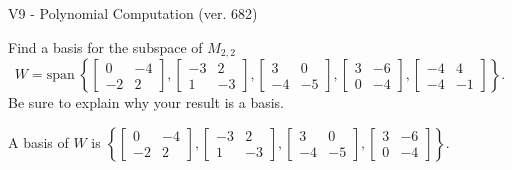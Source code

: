 \begin{exercise}
  \begin{exerciseTitle}V9 - Polynomial Computation (ver. 682)\end{exerciseTitle}
  \begin{exerciseStatement}
    Find a basis for the subspace of \(M_{2,2}\) 
\[W=\mathrm{span}\ \left\{\left[\begin{array}{cc}
0 & -4 \\
-2 & 2
\end{array}\right] , \left[\begin{array}{cc}
-3 & 2 \\
1 & -3
\end{array}\right] , \left[\begin{array}{cc}
3 & 0 \\
-4 & -5
\end{array}\right] , \left[\begin{array}{cc}
3 & -6 \\
0 & -4
\end{array}\right] , \left[\begin{array}{cc}
-4 & 4 \\
-4 & -1
\end{array}\right]\right\}.\]
 Be sure to explain why your result is a basis.


  \end{exerciseStatement}
  \begin{exerciseAnswer}
   A basis of \(W\) is  \(\left\{\left[\begin{array}{cc}
0 & -4 \\
-2 & 2
\end{array}\right] , \left[\begin{array}{cc}
-3 & 2 \\
1 & -3
\end{array}\right] , \left[\begin{array}{cc}
3 & 0 \\
-4 & -5
\end{array}\right] , \left[\begin{array}{cc}
3 & -6 \\
0 & -4
\end{array}\right]\right\}\).
  


  \end{exerciseAnswer}
\end{exercise}